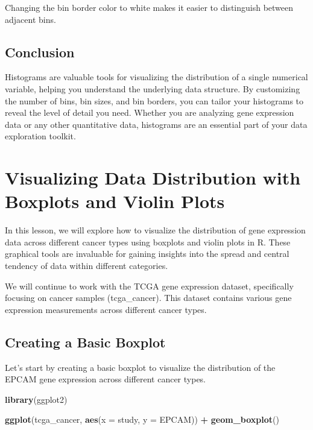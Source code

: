 \documentclass[
]{book}
\newenvironment{Shaded}{\begin{snugshade}}{\end{snugshade}}
\newcommand{\AttributeTok}[1]{\textcolor[rgb]{0.13,0.29,0.53}{#1}}
\newcommand{\FunctionTok}[1]{\textcolor[rgb]{0.13,0.29,0.53}{\textbf{#1}}}
\newcommand{\NormalTok}[1]{#1}
\newcommand{\SpecialCharTok}[1]{\textcolor[rgb]{0.81,0.36,0.00}{\textbf{#1}}}
\begin{document}
Changing the bin border color to white makes it easier to distinguish between adjacent bins.

\hypertarget{conclusion-23}{%
\subsection{Conclusion}\label{conclusion-23}}

Histograms are valuable tools for visualizing the distribution of a single numerical variable, helping you understand the underlying data structure. By customizing the number of bins, bin sizes, and bin borders, you can tailor your histograms to reveal the level of detail you need. Whether you are analyzing gene expression data or any other quantitative data, histograms are an essential part of your data exploration toolkit.

\hypertarget{visualizing-data-distribution-with-boxplots-and-violin-plots}{%
\section{Visualizing Data Distribution with Boxplots and Violin Plots}\label{visualizing-data-distribution-with-boxplots-and-violin-plots}}

In this lesson, we will explore how to visualize the distribution of gene expression data across different cancer types using boxplots and violin plots in R. These graphical tools are invaluable for gaining insights into the spread and central tendency of data within different categories.

We will continue to work with the TCGA gene expression dataset, specifically focusing on cancer samples (tcga\_cancer). This dataset contains various gene expression measurements across different cancer types.

\hypertarget{creating-a-basic-boxplot}{%
\subsection{Creating a Basic Boxplot}\label{creating-a-basic-boxplot}}

Let's start by creating a basic boxplot to visualize the distribution of the EPCAM gene expression across different cancer types.

\begin{Shaded}
\begin{Highlighting}[]
\FunctionTok{library}\NormalTok{(ggplot2)}

\FunctionTok{ggplot}\NormalTok{(tcga\_cancer, }\FunctionTok{aes}\NormalTok{(}\AttributeTok{x =}\NormalTok{ study, }\AttributeTok{y =}\NormalTok{ EPCAM)) }\SpecialCharTok{+}
  \FunctionTok{geom\_boxplot}\NormalTok{()}
\end{Highlighting}
\end{Shaded}
\end{document}
